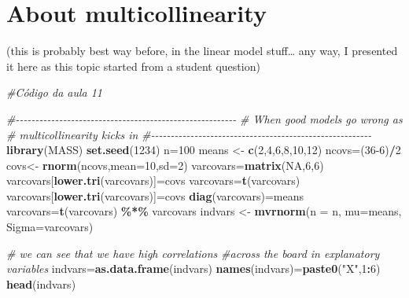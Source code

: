 \documentclass[
]{book}
\newenvironment{Shaded}{\begin{snugshade}}{\end{snugshade}}
\newcommand{\AttributeTok}[1]{\textcolor[rgb]{0.13,0.29,0.53}{#1}}
\newcommand{\CommentTok}[1]{\textcolor[rgb]{0.56,0.35,0.01}{\textit{#1}}}
\newcommand{\ConstantTok}[1]{\textcolor[rgb]{0.56,0.35,0.01}{#1}}
\newcommand{\DecValTok}[1]{\textcolor[rgb]{0.00,0.00,0.81}{#1}}
\newcommand{\FunctionTok}[1]{\textcolor[rgb]{0.13,0.29,0.53}{\textbf{#1}}}
\newcommand{\NormalTok}[1]{#1}
\newcommand{\OtherTok}[1]{\textcolor[rgb]{0.56,0.35,0.01}{#1}}
\newcommand{\SpecialCharTok}[1]{\textcolor[rgb]{0.81,0.36,0.00}{\textbf{#1}}}
\newcommand{\StringTok}[1]{\textcolor[rgb]{0.31,0.60,0.02}{#1}}
\begin{document}
\hypertarget{about-multicollinearity}{%
\section{About multicollinearity}\label{about-multicollinearity}}

(this is probably best way before, in the linear model stuff\ldots{} any way, I presented it here as this topic started from a student question)

\begin{Shaded}
\begin{Highlighting}[]
\CommentTok{\#Código da aula 11}

\CommentTok{\#{-}{-}{-}{-}{-}{-}{-}{-}{-}{-}{-}{-}{-}{-}{-}{-}{-}{-}{-}{-}{-}{-}{-}{-}{-}{-}{-}{-}{-}{-}{-}{-}{-}{-}{-}{-}{-}{-}{-}{-}{-}{-}{-}{-}{-}{-}{-}{-}{-}{-}{-}{-}{-}{-}{-}{-}}
\CommentTok{\# When good models go wrong as }
\CommentTok{\# multicollinearity kicks in}
\CommentTok{\#{-}{-}{-}{-}{-}{-}{-}{-}{-}{-}{-}{-}{-}{-}{-}{-}{-}{-}{-}{-}{-}{-}{-}{-}{-}{-}{-}{-}{-}{-}{-}{-}{-}{-}{-}{-}{-}{-}{-}{-}{-}{-}{-}{-}{-}{-}{-}{-}{-}{-}{-}{-}{-}{-}{-}{-}}
\FunctionTok{library}\NormalTok{(MASS)}
\FunctionTok{set.seed}\NormalTok{(}\DecValTok{1234}\NormalTok{)}
\NormalTok{n}\OtherTok{=}\DecValTok{100}
\NormalTok{means }\OtherTok{\textless{}{-}} \FunctionTok{c}\NormalTok{(}\DecValTok{2}\NormalTok{,}\DecValTok{4}\NormalTok{,}\DecValTok{6}\NormalTok{,}\DecValTok{8}\NormalTok{,}\DecValTok{10}\NormalTok{,}\DecValTok{12}\NormalTok{)}
\NormalTok{ncovs}\OtherTok{=}\NormalTok{(}\DecValTok{36{-}6}\NormalTok{)}\SpecialCharTok{/}\DecValTok{2}
\NormalTok{covs}\OtherTok{\textless{}{-}} \FunctionTok{rnorm}\NormalTok{(ncovs,}\AttributeTok{mean=}\DecValTok{10}\NormalTok{,}\AttributeTok{sd=}\DecValTok{2}\NormalTok{)}
\NormalTok{varcovars}\OtherTok{=}\FunctionTok{matrix}\NormalTok{(}\ConstantTok{NA}\NormalTok{,}\DecValTok{6}\NormalTok{,}\DecValTok{6}\NormalTok{)}
\NormalTok{varcovars[}\FunctionTok{lower.tri}\NormalTok{(varcovars)]}\OtherTok{=}\NormalTok{covs}
\NormalTok{varcovars}\OtherTok{=}\FunctionTok{t}\NormalTok{(varcovars)}
\NormalTok{varcovars[}\FunctionTok{lower.tri}\NormalTok{(varcovars)]}\OtherTok{=}\NormalTok{covs}
\FunctionTok{diag}\NormalTok{(varcovars)}\OtherTok{=}\NormalTok{means}
\NormalTok{varcovars}\OtherTok{=}\FunctionTok{t}\NormalTok{(varcovars) }\SpecialCharTok{\%*\%}\NormalTok{ varcovars}
\NormalTok{indvars }\OtherTok{\textless{}{-}} \FunctionTok{mvrnorm}\NormalTok{(}\AttributeTok{n =}\NormalTok{ n, }\AttributeTok{mu=}\NormalTok{means, }\AttributeTok{Sigma=}\NormalTok{varcovars)}

\CommentTok{\# we can see that we have high correlations }
\CommentTok{\#across the board in explanatory variables}
\NormalTok{indvars}\OtherTok{=}\FunctionTok{as.data.frame}\NormalTok{(indvars)}
\FunctionTok{names}\NormalTok{(indvars)}\OtherTok{=}\FunctionTok{paste0}\NormalTok{(}\StringTok{"X"}\NormalTok{,}\DecValTok{1}\SpecialCharTok{:}\DecValTok{6}\NormalTok{)}
\FunctionTok{head}\NormalTok{(indvars)}
\end{Highlighting}
\end{Shaded}
\end{document}
